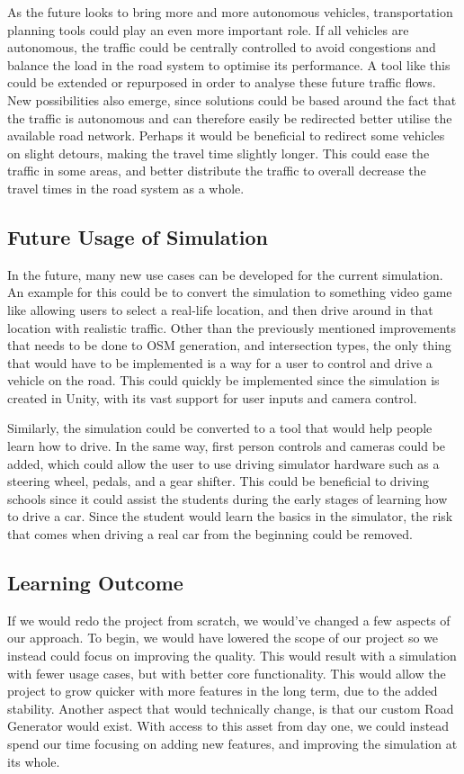         As the future looks to bring more and more autonomous vehicles, transportation planning tools could play an even more important role. If all vehicles are autonomous, the traffic could be centrally controlled to avoid congestions and balance the load in the road system to optimise its performance. A tool like this could be extended or repurposed in order to analyse these future traffic flows. New possibilities also emerge, since solutions could be based around the fact that the traffic is autonomous and can therefore easily be redirected better utilise the available road network. Perhaps it would be beneficial to redirect some vehicles on slight detours, making the travel time slightly longer. This could ease the traffic in some areas, and better distribute the traffic to overall decrease the travel times in the road system as a whole.


    \subsection{Future Usage of Simulation}
        In the future, many new use cases can be developed for the current simulation. An example for this could be to convert the simulation to something video game like allowing users to select a real-life location, and then drive around in that location with realistic traffic. Other than the previously mentioned improvements that needs to be done to OSM generation, and intersection types, the only thing that would have to be implemented is a way for a user to control and drive a vehicle on the road. This could quickly be implemented since the simulation is created in Unity, with its vast support for user inputs and camera control. 

        Similarly, the simulation could be converted to a tool that would help people learn how to drive. In the same way, first person controls and cameras could be added, which could allow the user to use driving simulator hardware such as a steering wheel, pedals, and a gear shifter. This could be beneficial to driving schools since it could assist the students during the early stages of learning how to drive a car. Since the student would learn the basics in the simulator, the risk that comes when driving a real car from the beginning could be removed. 

    
    \subsection{Learning Outcome}
        If we would redo the project from scratch, we would've changed a few aspects of our approach. To begin, we would have lowered the scope of our project so we instead could focus on improving the quality. This would result with a simulation with fewer usage cases, but with better core functionality. This would allow the project to grow quicker with more features in the long term, due to the added stability. Another aspect that would technically change, is that our custom Road Generator would exist. With access to this asset from day one, we could instead spend our time focusing on adding new features, and improving the simulation at its whole. 

